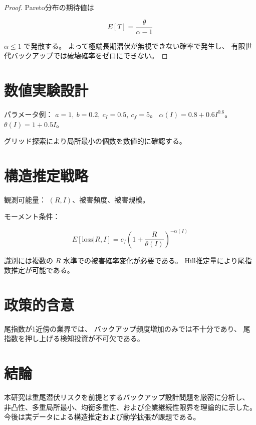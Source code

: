 \documentclass[12pt,a4paper]{article}
\begin{document}
\begin{proof}
Pareto分布の期待値は

\begin{equation}
E[T]=\frac{\theta}{\alpha-1}
\end{equation}

$\alpha\le1$ で発散する。
よって極端長期潜伏が無視できない確率で発生し、
有限世代バックアップでは破壊確率をゼロにできない。
\end{proof}

\section{数値実験設計}

パラメータ例：
$a=1,\ b=0.2,\ c_I=0.5,\ c_f=5$。
$\alpha(I)=0.8+0.6 I^{0.6}$。
$\theta(I)=1+0.5I$。

グリッド探索により局所最小の個数を数値的に確認する。

\section{構造推定戦略}

観測可能量：
$(R,I)$、被害頻度、被害規模。

モーメント条件：

\begin{equation}
E[\text{loss}|R,I]=c_f\left(1+\frac{R}{\theta(I)}\right)^{-\alpha(I)}
\end{equation}

識別には複数の $R$ 水準での被害確率変化が必要である。
Hill推定量により尾指数推定が可能である。

\section{政策的含意}

尾指数が1近傍の業界では、
バックアップ頻度増加のみでは不十分であり、
尾指数を押し上げる検知投資が不可欠である。

\section{結論}

本研究は重尾潜伏リスクを前提とするバックアップ設計問題を厳密に分析し、
非凸性、多重局所最小、均衡多重性、および企業継続性限界を理論的に示した。
今後は実データによる構造推定および動学拡張が課題である。
\end{document}
